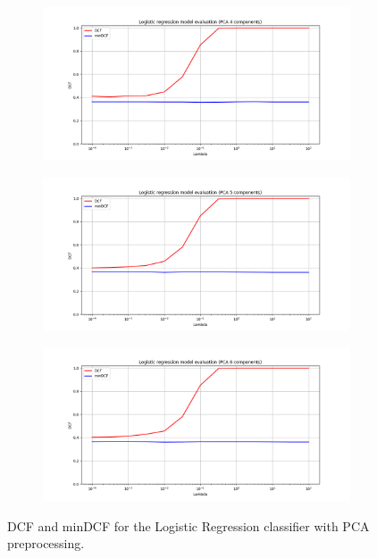 \documentclass[12pt]{report}
\begin{document}
\begin{figure}[H]
\begin{subfigure}[t]{0.32\textwidth}
    \end{subfigure}
    \begin{subfigure}[t]{0.32\textwidth}
        \includegraphics[width=\textwidth]{./plot/LR/log_reg_pca4.png}
    \end{subfigure}
    \hfill
    \begin{subfigure}[t]{0.32\textwidth}
        \includegraphics[width=\textwidth]{./plot/LR/log_reg_pca5.png}
    \end{subfigure}
    \hfill
    \begin{subfigure}[t]{0.32\textwidth}
        \includegraphics[width=\textwidth]{./plot/LR/log_reg_pca6.png}
    \end{subfigure}

    \caption{DCF and minDCF for the Logistic Regression classifier with PCA preprocessing.}
    \label{fig:log_reg_pca}
\end{figure}
\end{document}
